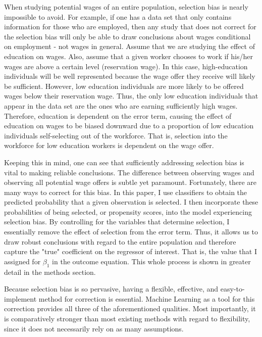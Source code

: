 \documentclass[12pt,english]{article}
\begin{document}
When studying potential wages of an entire population, selection bias is nearly impossible to avoid. For example, if one has a data set that only contains information for those who are employed, then any study that does not correct for the selection bias will only be able to draw conclusions about wages conditional on employment -  not wages in general. Assume that we are studying the effect of education on wages. Also, assume that a given worker chooses to work if his/her wages are above a certain level (reservation wage). In this case, high-education individuals will be well represented because the wage offer they receive will likely be sufficient. However, low education individuals are more likely to be offered wages below their reservation wage. Thus, the only low education individuals that appear in the data set are the ones who are earning sufficiently high wages. Therefore, education is dependent on the error term, causing the effect of education on wages to be biased downward due to a proportion of low education individuals self-selecting out of the workforce. That is, selection into the workforce for low education workers is dependent on the wage offer.
\par
Keeping this in mind, one can see that sufficiently addressing selection bias is vital to making reliable conclusions. The difference between observing wages and observing all potential wage offers is subtle yet paramount. Fortunately, there are many ways to correct for this bias. In this paper, I use classifiers to obtain the predicted probability that a given observation is selected. I then incorporate these probabilities of being selected, or propensity scores, into the model experiencing selection bias. By controlling for the variables that determine selection, I essentially remove the effect of selection from the error term. Thus, it allows us to draw robust conclusions with regard to the entire population and therefore capture the "true" coefficient on the regressor of interest. That is, the value that I assigned for $\beta_1$ in the outcome equation. This whole process is shown in greater detail in the methods section.
\par
Because selection bias is so pervasive, having a flexible, effective, and easy-to-implement method for correction is essential. Machine Learning as a tool for this correction provides all three of the aforementioned qualities. Most importantly, it is comparatively stronger than most existing methods with regard to flexibility, since it does not necessarily rely on as many assumptions.
\end{document}

